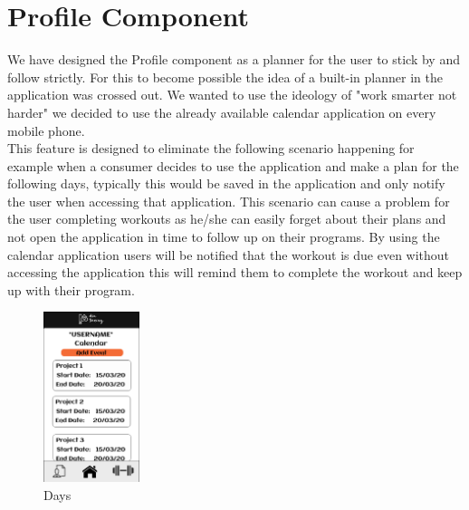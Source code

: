 \documentclass[a4paper,12pt]{report}
\begin{document}
\section{Profile Component}
We have designed the Profile component as a planner for the user to stick by and follow strictly.
For this to become possible the idea of a built-in planner in the application was crossed out.
We wanted to use the ideology of "work smarter not harder" we decided to use the already available calendar application on every mobile phone.\\
This feature is designed to eliminate the following scenario happening for example when a consumer decides to use the application and make a plan for the following days, typically this would be saved in the application and only notify the user when accessing that application. This scenario can cause a problem for the user completing workouts as he/she can easily forget about their plans and not open the application in time to follow up on their programs.
By using the calendar application users will be notified that the workout is due even without accessing the application this will remind them to complete the workout and keep up with their program.
\begin{figure}
\centering
\includegraphics[width=0.25\textwidth]{images/profilePageBorder.png}
\caption{\label{fig:pComponent}Days}
\end{figure}
\end{document}
